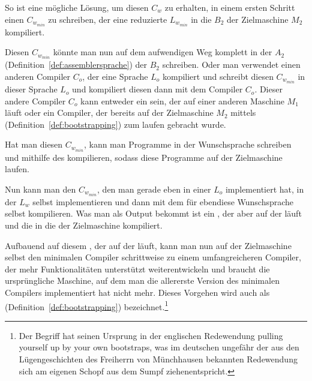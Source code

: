 So ist eine mögliche Lösung, um diesen  $C_w$ zu erhalten, in einem ersten Schritt einen  $C_{w_{min}}$ zu schreiben, der eine reduzierte  $L_{w_{min}}$ in die  $B_2$ der Zielmaschine $M_2$ kompiliert.

Diesen  $C_{w_{min}}$ könnte man nun auf dem aufwendigen Weg komplett in der  $A_2$ (Definition~\ref{def:assemblersprache}) der  $B_2$ schreiben. Oder man verwendet einen anderen Compiler $C_o$, der eine Sprache $L_o$ kompiliert und schreibt diesen  $C_{w_{min}}$ in dieser Sprache $L_o$ und kompiliert diesen dann mit dem Compiler $C_o$. Dieser andere Compiler $C_o$ kann entweder ein  sein, der auf einer anderen Maschine $M_1$ läuft oder ein Compiler, der bereits auf der Zielmaschine $M_2$ mittels  (Definition~\ref{def:bootstrapping}) zum laufen gebracht wurde.

Hat man diesen  $C_{w_{min}}$, kann man Programme in der Wunschsprache schreiben und mithilfe des  kompilieren, sodass diese Programme auf der Zielmaschine laufen.

Nun kann man den  $C_{w_{min}}$, den man gerade eben in einer  $L_o$ implementiert hat, in der  $L_w$ selbst implementieren und dann mit dem  für ebendiese Wunschsprache selbst kompilieren. Was man als Output bekommt ist ein , der aber auf der  läuft und die  in die  der Zielmaschine kompiliert.

Aufbauend auf diesem , der auf der  läuft, kann man nun auf der Zielmaschine selbst  den minimalen Compiler schrittweise zu einem umfangreicheren Compiler, der mehr Funktionalitäten unterstützt weiterentwickeln und braucht die ursprüngliche Maschine, auf dem man die allererste Version des minimalen Compilers implementiert hat nicht mehr. Dieses Vorgehen wird auch als  (Definition~\ref{def:bootstrapping}) bezeichnet.\footnote{Der Begriff hat seinen Ursprung in der englischen Redewendung \glqq pulling yourself up by your own bootstraps\grqq, was im deutschen ungefähr der aus den Lügengeschichten des Freiherrn von Münchhausen bekannten Redewendung \glqq sich am eigenen Schopf aus dem Sumpf ziehen\grqq entspricht.}

